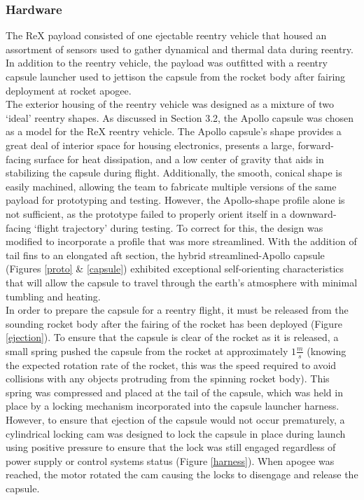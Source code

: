 \documentclass{article}
\begin{document}
\begin{doublespace}
		\subsubsection{Hardware}
		\indent\indent The ReX payload consisted of one ejectable reentry vehicle that housed an assortment of sensors used to gather dynamical and thermal data during reentry. In addition to the reentry vehicle, the payload was outfitted with a reentry capsule launcher used to jettison the capsule from the rocket body after fairing deployment at rocket apogee.\\
		\indent The exterior housing of the reentry vehicle was designed as a mixture of two `ideal' reentry shapes. As discussed in Section 3.2, the Apollo capsule was chosen as a model for the ReX reentry vehicle. The Apollo capsule's shape provides a great deal of interior space for housing electronics, presents a large, forward-facing surface for heat dissipation, and a low center of gravity that aids in stabilizing the capsule during flight. Additionally, the smooth, conical shape is easily machined, allowing the team to fabricate multiple versions of the same payload for prototyping and testing. However, the Apollo-shape profile alone is not sufficient, as the prototype failed to properly orient itself in a downward-facing `flight trajectory' during testing. To correct for this, the design was modified to incorporate a profile that was more streamlined. With the addition of tail fins to an elongated aft section, the hybrid streamlined-Apollo capsule (Figures \ref{proto} \& \ref{capsule}) exhibited exceptional self-orienting characteristics that will allow the capsule to travel through the earth's atmosphere with minimal tumbling and heating.\\
		\indent  In order to prepare the capsule for a reentry flight, it must be released from the sounding rocket body after the fairing of the rocket has been deployed (Figure \ref{ejection}). To ensure that the capsule is clear of the rocket as it is released, a small spring pushed the capsule from the rocket at approximately $1\frac{m}{s}$ (knowing the expected rotation rate of the rocket, this was the speed required to avoid collisions with any objects protruding from the spinning rocket body). This spring was compressed and placed at the tail of the capsule, which was held in place by a locking mechanism incorporated into the capsule launcher harness. However, to ensure that ejection of the capsule would not occur prematurely, a cylindrical locking cam was designed to lock the capsule in place during launch using positive pressure to ensure that the lock was still engaged regardless of power supply or control systems status (Figure \ref{harness}). When apogee was reached, the motor rotated the cam causing the locks to disengage and release the capsule.\\

\end{doublespace}
\end{document}
